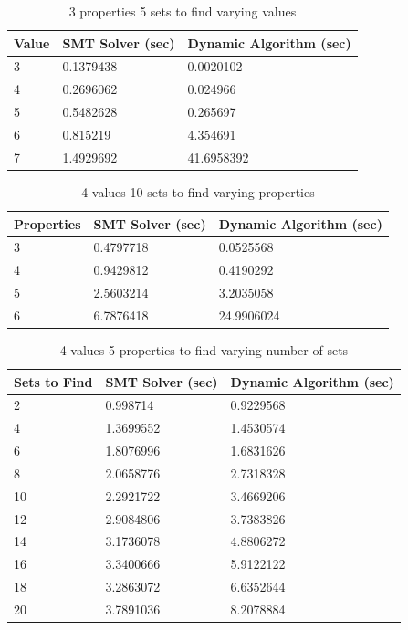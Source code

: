 \documentclass[pageno]{jpaper}
\begin{document}
\begin{table}[htbp]
  \centering
  \begin{tabular}{|l   |l   |l | } \hline
    \textbf{Value} & \textbf{SMT Solver (sec)}  & \textbf{Dynamic Algorithm (sec)} \\\hline
3 & 0.1379438 & 0.0020102 \\ \hline
4 & 0.2696062 & 0.024966 \\ \hline
5 & 0.5482628 & 0.265697 \\ \hline
6 & 0.815219 & 4.354691 \\ \hline
7 & 1.4929692 & 41.6958392 \\ \hline
  \end{tabular}
  \caption{3 properties 5 sets to find varying values}
  \label{table:DvSValTable}
\end{table}

\begin{table}[htbp]
  \centering
  \begin{tabular}{|l   |l   |l | } \hline
    \textbf{Properties} & \textbf{SMT Solver (sec)}  & \textbf{Dynamic Algorithm (sec)} \\\hline
3 & 0.4797718 & 0.0525568 \\ \hline
4 & 0.9429812 & 0.4190292 \\ \hline
5 & 2.5603214 & 3.2035058 \\ \hline
6 & 6.7876418 & 24.9906024 \\ \hline
  \end{tabular}
  \caption{4 values 10 sets to find varying properties}
  \label{table:DvSPropTable}
\end{table}


\begin{table}[htbp]
  \centering
  \begin{tabular}{|l   |l   |l | } \hline
    \textbf{Sets to Find} & \textbf{SMT Solver (sec)}  & \textbf{Dynamic Algorithm (sec)} \\\hline
2 & 0.998714 & 0.9229568 \\ \hline
4 & 1.3699552 & 1.4530574 \\ \hline
6 & 1.8076996 & 1.6831626 \\ \hline
8 & 2.0658776 & 2.7318328 \\ \hline
10 &  2.2921722 & 3.4669206 \\ \hline
12 &  2.9084806 & 3.7383826 \\ \hline
14 &  3.1736078 & 4.8806272 \\ \hline
16 &  3.3400666 & 5.9122122 \\ \hline
18 &  3.2863072 & 6.6352644 \\ \hline
20 &  3.7891036 & 8.2078884 \\ \hline
  \end{tabular}
  \caption{4 values 5 properties to find varying number of sets}
  \label{table:DvSSetTable}
\end{table}
\end{document}
